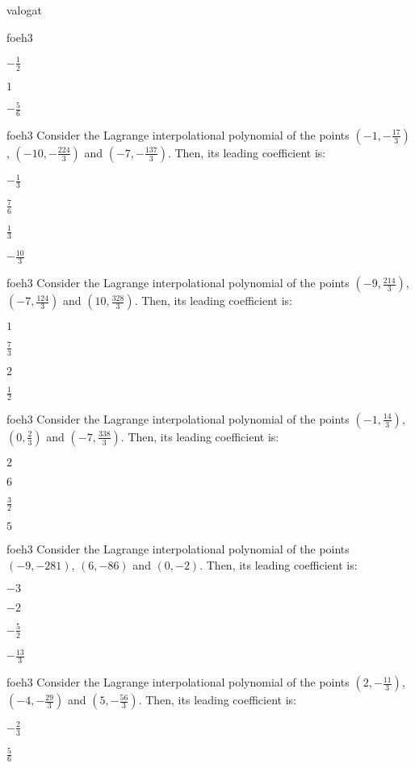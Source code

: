 \documentclass[12pt]{article}
\begin{document}
\begin{quiz}{valogat}
\begin{multi}{foeh3}
\item  $ -\frac{1}{2} $
\item  $ 1 $
\item  $ -\frac{5}{6} $
\end{multi}
\begin{multi}{foeh3}
Consider the Lagrange interpolational polynomial of the points $(-1,-\frac{17}{3})$, $(-10,-\frac{224}{3})$ and $(-7,-\frac{137}{3})$.
Then, its leading coefficient is:
\item* $ -\frac{1}{3} $
\item  $ \frac{7}{6} $
\item  $ \frac{1}{3} $
\item  $ -\frac{10}{3} $
\end{multi}
\begin{multi}{foeh3}
Consider the Lagrange interpolational polynomial of the points $(-9,\frac{214}{3})$, $(-7,\frac{124}{3})$ and $(10,\frac{328}{3})$.
Then, its leading coefficient is:
\item* $ 1 $
\item  $ \frac{7}{3} $
\item  $ 2 $
\item  $ \frac{1}{2} $
\end{multi}
\begin{multi}{foeh3}
Consider the Lagrange interpolational polynomial of the points $(-1,\frac{14}{3})$, $(0,\frac{2}{3})$ and $(-7,\frac{338}{3})$.
Then, its leading coefficient is:
\item* $ 2 $
\item  $ 6 $
\item  $ \frac{3}{2} $
\item  $ 5 $
\end{multi}
\begin{multi}{foeh3}
Consider the Lagrange interpolational polynomial of the points $(-9,-281)$, $(6,-86)$ and $(0,-2)$.
Then, its leading coefficient is:
\item* $ -3 $
\item  $ -2 $
\item  $ -\frac{5}{2} $
\item  $ -\frac{13}{3} $
\end{multi}
\begin{multi}{foeh3}
Consider the Lagrange interpolational polynomial of the points $(2,-\frac{11}{3})$, $(-4,-\frac{29}{3})$ and $(5,-\frac{56}{3})$.
Then, its leading coefficient is:
\item* $ -\frac{2}{3} $
\item  $ \frac{5}{6} $

\end{multi}
\end{quiz}
\end{document}
